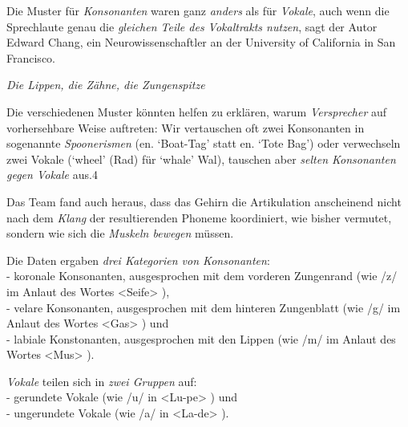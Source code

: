 \documentclass[
  letterpaper,
]{scrbook}
\begin{document}
Die Muster für \emph{Konsonanten} waren ganz \emph{anders} als für
\emph{Vokale}, auch wenn die Sprechlaute genau die \emph{gleichen Teile
des Vokaltrakts nutzen}, sagt der Autor Edward Chang, ein
Neurowissenschaftler an der University of California in San Francisco.

\emph{Die Lippen, die Zähne, die Zungenspitze}

Die verschiedenen Muster könnten helfen zu erklären, warum
\emph{Versprecher} auf vorhersehbare Weise auftreten: Wir vertauschen
oft zwei Konsonanten in sogenannte \emph{Spoonerismen} (en. `Boat-Tag'
statt en. `Tote Bag') oder verwechseln zwei Vokale (`wheel' (Rad) für
`whale' Wal), tauschen aber \emph{selten Konsonanten gegen Vokale} aus.4

Das Team fand auch heraus, dass das Gehirn die Artikulation anscheinend
nicht nach dem \emph{Klang} der resultierenden Phoneme koordiniert, wie
bisher vermutet, sondern wie sich die \emph{Muskeln bewegen} müssen.

\begin{tcolorbox}[enhanced jigsaw, titlerule=0mm, arc=.35mm, breakable, opacitybacktitle=0.6, title=\textcolor{quarto-callout-important-color}{\faExclamation}\hspace{0.5em}{Phonemkategorien (nach Muskelbewegungen)}, colframe=quarto-callout-important-color-frame, leftrule=.75mm, rightrule=.15mm, coltitle=black, colbacktitle=quarto-callout-important-color!10!white, bottomtitle=1mm, left=2mm, colback=white, toptitle=1mm, bottomrule=.15mm, toprule=.15mm, opacityback=0]

Die Daten ergaben \emph{drei Kategorien von Konsonanten}:\\
- koronale Konsonanten, ausgesprochen mit dem vorderen Zungenrand (wie
/z/ im Anlaut des Wortes \textless Seife\textgreater{} ),\\
- velare Konsonanten, ausgesprochen mit dem hinteren Zungenblatt (wie
/g/ im Anlaut des Wortes \textless Gas\textgreater{} ) und\\
- labiale Konstonanten, ausgesprochen mit den Lippen (wie /m/ im Anlaut
des Wortes \textless Mus\textgreater{} ).

\emph{Vokale} teilen sich in \emph{zwei Gruppen} auf:\\
- gerundete Vokale (wie /u/ in \textless Lu-pe\textgreater{} ) und\\
- ungerundete Vokale (wie /a/ in \textless La-de\textgreater{} ).

\end{tcolorbox}
\end{document}
